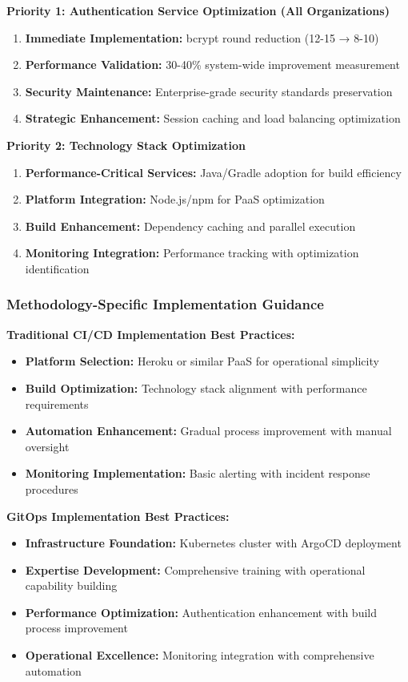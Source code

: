 \textbf{Priority 1: Authentication Service Optimization (All Organizations)}
\begin{enumerate}
\item \textbf{Immediate Implementation:} bcrypt round reduction (12-15 → 8-10)
\item \textbf{Performance Validation:} 30-40\% system-wide improvement measurement
\item \textbf{Security Maintenance:} Enterprise-grade security standards preservation
\item \textbf{Strategic Enhancement:} Session caching and load balancing optimization
\end{enumerate}

\textbf{Priority 2: Technology Stack Optimization}
\begin{enumerate}
\item \textbf{Performance-Critical Services:} Java/Gradle adoption for build efficiency
\item \textbf{Platform Integration:} Node.js/npm for PaaS optimization
\item \textbf{Build Enhancement:} Dependency caching and parallel execution
\item \textbf{Monitoring Integration:} Performance tracking with optimization identification
\end{enumerate}

\subsubsection{Methodology-Specific Implementation Guidance}

\textbf{Traditional CI/CD Implementation Best Practices:}
\begin{itemize}
\item \textbf{Platform Selection:} Heroku or similar PaaS for operational simplicity
\item \textbf{Build Optimization:} Technology stack alignment with performance requirements
\item \textbf{Automation Enhancement:} Gradual process improvement with manual oversight
\item \textbf{Monitoring Implementation:} Basic alerting with incident response procedures
\end{itemize}

\textbf{GitOps Implementation Best Practices:}
\begin{itemize}
\item \textbf{Infrastructure Foundation:} Kubernetes cluster with ArgoCD deployment
\item \textbf{Expertise Development:} Comprehensive training with operational capability building
\item \textbf{Performance Optimization:} Authentication enhancement with build process improvement
\item \textbf{Operational Excellence:} Monitoring integration with comprehensive automation
\end{itemize}

